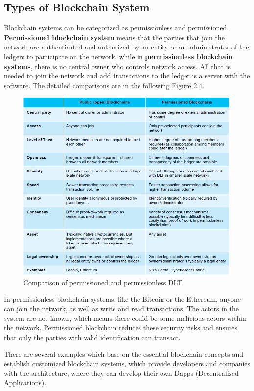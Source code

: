 \subsection{Types of Blockchain System}
Blockchain systems can be categorized as permissionless and permissioned. \textbf{Permissioned blockchain system} means that the parties that join the network are authenticated and authorized by an entity or
an administrator of the ledgers to participate on the network. while in \textbf{permissionless blockchain systems}, there is no central owner who controls network access. All that is needed to join the network and add transactions to the ledger is a server with the software.
The detailed comparisons are in the following Figure 2.4.\\
\begin{figure}[!htb]%
	\includegraphics[width=\textwidth]{charts/permission}
	\caption{Comparison of permissioned and permissionless DLT}
\end{figure}
In permissionless blockchain systems, like the Bitcoin or the Ethereum, anyone can join the network, as well as write and read transactions. The actors in the system are not known, which means there could be some malicious actors within the network. Permissioned blockchain reduces these security risks and ensures that only the parties with valid identification can transact. 

There are several examples which base on the essential blockchain concepts and establish customized blockchain systems, which provide developers and companies with the architecture, where they can develop their own Dapps (Decentralized Applications).
  

